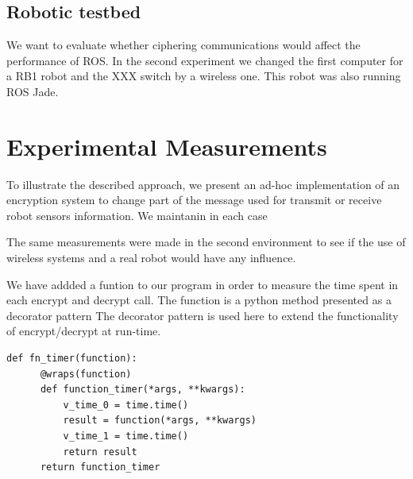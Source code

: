 \documentclass[journal,twoside]{JoPhA}
\begin{document}
\subsection{Robotic testbed}

We want to evaluate whether ciphering communications would affect the performance of ROS. 
In the second experiment we changed the first computer for a RB1 robot and the XXX switch by a wireless one. This robot was also running ROS Jade.



\section{Experimental Measurements}

To illustrate the described approach, we present an ad-hoc implementation of an encryption system to change part of the message used for transmit or receive robot sensors information. 
We maintanin in each case 


The same measurements were made in the second environment to see if the use of wireless systems and a real robot would have any influence.



We have addded a funtion to our program in order to measure the time spent in each encrypt and decrypt call. The function is a python method presented as a decorator pattern 
The decorator pattern is used here to extend the functionality of encrypt/decrypt at run-time. 


{
  \footnotesize{
    \begin{Verbatim}[frame=single]
def fn_timer(function):
	  @wraps(function)
	  def function_timer(*args, **kwargs):
	      v_time_0 = time.time()
	      result = function(*args, **kwargs)
	      v_time_1 = time.time()
	      return result
	  return function_timer
    \end{Verbatim}
  }
}
\end{document}

